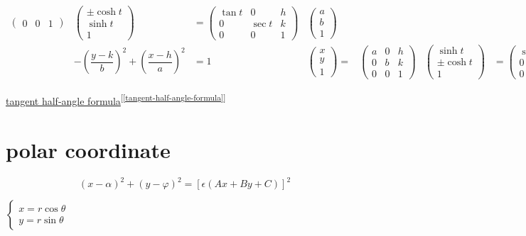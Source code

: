\documentclass[
]{book}
\theoremstyle{definition}
\theoremstyle{definition}
\theoremstyle{definition}
\theoremstyle{definition}
\theoremstyle{remark}
\begin{document}
\[\begin{array}{cccccccc}
\begin{pmatrix}
0 & 0 & 1
\end{pmatrix} & \begin{pmatrix}\pm\cosh t\\
\sinh t\\
1
\end{pmatrix} & =\begin{pmatrix}\tan t & 0 & h\\
0 & \sec t & k\\
0 & 0 & 1
\end{pmatrix} & \begin{pmatrix}a\\
b\\
1
\end{pmatrix}\\
 & -\left(\dfrac{y-k}{b}\right)^{2}+\left(\dfrac{x-h}{a}\right)^{2} & =1 & \begin{pmatrix}x\\
y\\
1
\end{pmatrix}= & \begin{pmatrix}a & 0 & h\\
0 & b & k\\
0 & 0 & 1
\end{pmatrix} & \begin{pmatrix}\sinh t\\
\pm\cosh t\\
1
\end{pmatrix} & =\begin{pmatrix}\sec t & 0 & h\\
0 & \tan t & k\\
0 & 0 & 1
\end{pmatrix} & \begin{pmatrix}a\\
b\\
1
\end{pmatrix}
\end{array}
\]

\hyperref[tangent-half-angle-formula]{tangent half-angle formula}\textsuperscript{{[}\ref{tangent-half-angle-formula}{]}}

\section{polar coordinate}\label{polar-coordinate-1}

\[
\left(x-\alpha\right)^{2}+\left(y-\varphi\right)^{2}=\left[\epsilon\left(Ax+By+C\right)\right]^{2}
\]

\(\begin{cases}x=r\cos\theta\\y=r\sin\theta\end{cases}\)
\end{document}
